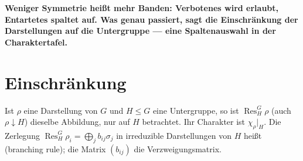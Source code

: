 \begin{merksatz}
\begin{center}
\begin{minipage}{0.9\textwidth}
\textbf{Weniger Symmetrie heißt mehr Banden: Verbotenes wird erlaubt, Entartetes spaltet auf. Was genau passiert, sagt die Einschränkung der Darstellungen auf die Untergruppe --- eine Spaltenauswahl in der Charaktertafel.}
\end{minipage}
\end{center}

\begin{center}
\begin{minipage}{0.88\textwidth}
\end{minipage}
\end{center}
\end{merksatz}

\section{Einschränkung}

\begin{definition}
Ist $\rho$ eine Darstellung von $G$ und $H\le G$ eine Untergruppe, so ist $\operatorname{Res}^G_H\rho$ (auch $\rho\downarrow H$) dieselbe Abbildung, nur auf $H$ betrachtet. Ihr Charakter ist $\chi_\rho|_H$. Die Zerlegung $\operatorname{Res}^G_H\rho_i = \bigoplus_jb_{ij}\sigma_j$ in irreduzible Darstellungen von $H$ heißt  (branching rule); die Matrix $(b_{ij})$ die Verzweigungsmatrix.
\end{definition}

